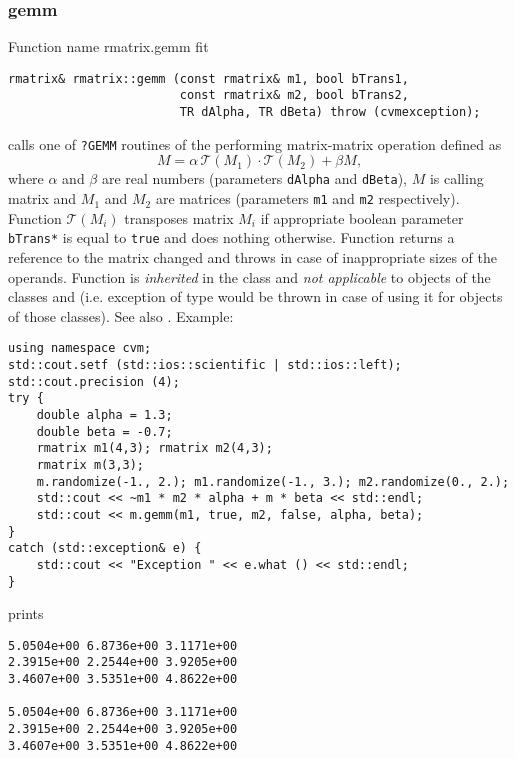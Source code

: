 \subsubsection{gemm}
Function%
\pdfdest name {rmatrix.gemm} fit
\begin{verbatim}
rmatrix& rmatrix::gemm (const rmatrix& m1, bool bTrans1,
                        const rmatrix& m2, bool bTrans2,
                        TR dAlpha, TR dBeta) throw (cvmexception);
\end{verbatim}
calls one of \verb"?GEMM" routines of the
performing 
matrix-matrix operation defined as
\begin{equation*}
M=\alpha\,\mathcal{T}(M_1)\cdot\mathcal{T}(M_2) + \beta M,
\end{equation*}
where $\alpha$ and $\beta$ are real numbers
(parameters \verb"dAlpha" and \verb"dBeta"),
$M$ is  calling matrix
and $M_1$ and $M_2$ are matrices (parameters \verb"m1"
and \verb"m2" respectively). Function $\mathcal{T}(M_i)$
transposes matrix $M_i$ if appropriate boolean
parameter \verb"bTrans*" is equal to \verb"true"
and does nothing otherwise.
Function
returns a reference to the matrix changed and throws
in case of inappropriate sizes of the operands.
Function is \emph{inherited} in the class
 and
\emph{not applicable} to objects of the classes
 and
 (i.e. exception of
type  would be thrown
in case of using it for objects of those classes).
See also
.
Example:
\begin{Verbatim}
using namespace cvm;
std::cout.setf (std::ios::scientific | std::ios::left);
std::cout.precision (4);
try {
    double alpha = 1.3;
    double beta = -0.7;
    rmatrix m1(4,3); rmatrix m2(4,3);
    rmatrix m(3,3);
    m.randomize(-1., 2.); m1.randomize(-1., 3.); m2.randomize(0., 2.);
    std::cout << ~m1 * m2 * alpha + m * beta << std::endl;
    std::cout << m.gemm(m1, true, m2, false, alpha, beta);
}
catch (std::exception& e) {
    std::cout << "Exception " << e.what () << std::endl;
}
\end{Verbatim}
prints
\begin{Verbatim}
5.0504e+00 6.8736e+00 3.1171e+00
2.3915e+00 2.2544e+00 3.9205e+00
3.4607e+00 3.5351e+00 4.8622e+00

5.0504e+00 6.8736e+00 3.1171e+00
2.3915e+00 2.2544e+00 3.9205e+00
3.4607e+00 3.5351e+00 4.8622e+00
\end{Verbatim}
\newpage


